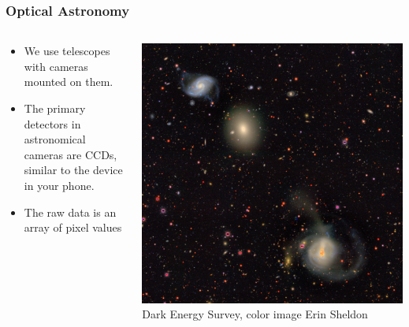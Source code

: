 \documentclass{beamer}
\begin{document}
\frame
{

    \frametitle{Optical Astronomy}


    \begin{columns}
        \begin{column}{0.4\textwidth}
            \begin{itemize}

                \item We use telescopes with cameras mounted on them.

                \item The primary detectors in astronomical cameras are CCDs,
                    similar to the device in your phone.
                    
                \item The raw data is an array of pixel values

            \end{itemize}
        \end{column}
        \begin{column}{0.6\textwidth}
            \begin{center}
                \includegraphics[width=\textwidth]{DES0428-4748_gri_sv_mask_streaks_color_trim.jpg}
                \newline
                {\tiny Dark Energy Survey, color image Erin Sheldon}
            \end{center}

            
        \end{column}
    \end{columns}


}
\end{document}
